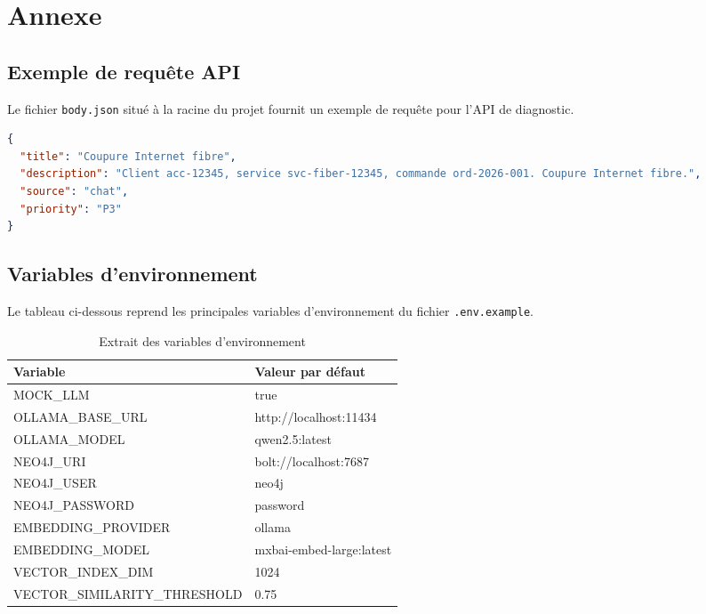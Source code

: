 \chapter*{Annexe}\label{annexe}

\section*{Exemple de requête API}
Le fichier \texttt{body.json} situé à la racine du projet fournit un exemple de requête pour l'API de diagnostic.

\begin{lstlisting}[language=JSON, caption={Exemple de payload JSON}, label={lst:bodyjson}]
{
  "title": "Coupure Internet fibre",
  "description": "Client acc-12345, service svc-fiber-12345, commande ord-2026-001. Coupure Internet fibre.",
  "source": "chat",
  "priority": "P3"
}
\end{lstlisting}

\section*{Variables d'environnement}
Le tableau ci-dessous reprend les principales variables d'environnement du fichier \texttt{.env.example}.

\begin{table}[H]
    \centering
    \renewcommand{\arraystretch}{1.2}
    \begin{tabular}{|l|l|}
        \hline
        \rowcolor{iNavy} \textbf{\color{white}Variable} & \textbf{\color{white}Valeur par défaut} \\ \hline
        MOCK\_LLM & true \\ \hline
        OLLAMA\_BASE\_URL & http://localhost:11434 \\ \hline
        OLLAMA\_MODEL & qwen2.5:latest \\ \hline
        NEO4J\_URI & bolt://localhost:7687 \\ \hline
        NEO4J\_USER & neo4j \\ \hline
        NEO4J\_PASSWORD & password \\ \hline
        EMBEDDING\_PROVIDER & ollama \\ \hline
        EMBEDDING\_MODEL & mxbai-embed-large:latest \\ \hline
        VECTOR\_INDEX\_DIM & 1024 \\ \hline
        VECTOR\_SIMILARITY\_THRESHOLD & 0.75 \\ \hline
    \end{tabular}
    \caption{Extrait des variables d'environnement}
\end{table}

